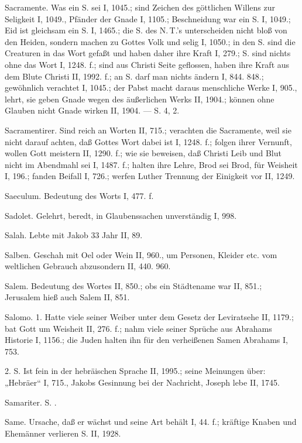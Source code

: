 Sacramente. Was ein S. sei I, 1045.; sind Zeichen des göttlichen Willens zur Seligkeit I, 1049., Pfänder der Gnade I, 1105.; Beschneidung war ein S. I, 1049.; Eid ist gleichsam ein S. I, 1465.; die S. des N.\,T.’s unterscheiden nicht bloß von den Heiden, sondern machen zu Gottes Volk und selig I, 1050.; in den S. sind die Creaturen in das Wort gefaßt und haben daher ihre Kraft I, 279.; S. sind nichts ohne das Wort I, 1248. f.; sind aus Christi Seite geflossen, haben ihre Kraft aus dem Blute Christi II, 1992. f.; an S. darf man nichts ändern I, 844. 848.; gewöhnlich verachtet I, 1045.; der Pabst macht daraus menschliche Werke I, 905., lehrt, sie geben Gnade wegen des äußerlichen Werks II, 1904.; können ohne Glauben nicht Gnade wirken II, 1904. — S.  4,  2.

Sacramentirer. Sind reich an Worten II, 715.; verachten die Sacramente, weil sie nicht darauf achten, daß Gottes Wort dabei ist I, 1248. f.; folgen ihrer Vernunft, wollen Gott meistern II, 1290. f.; wie sie beweisen, daß Christi Leib und Blut nicht im Abendmahl sei I, 1487. f.; halten ihre Lehre, Brod sei Brod, für Weisheit I, 196.; fanden Beifall I, 726.; werfen Luther Trennung der Einigkeit vor II, 1249.

Saeculum. Bedeutung des Worts I, 477. f.

Sadolet. Gelehrt, beredt, in Glaubenssachen unverständig I, 998.

Salah. Lebte mit Jakob 33 Jahr II, 89.

Salben. Geschah mit Oel oder Wein II, 960., um Personen, Kleider etc. vom weltlichen Gebrauch abzusondern II, 440. 960.

Salem. Bedeutung des Wortes II, 850.; obs ein Städtename war II, 851.; Jerusalem hieß auch Salem II, 851.

Salomo. 1.  Hatte viele seiner Weiber unter dem Gesetz der Leviratsehe II, 1179.; bat Gott um Weisheit II, 276. f.; nahm viele seiner Sprüche aus Abrahams Historie I, 1156.; die Juden halten ihn für den verheißenen Samen Abrahams I, 753.

2.  S. Ist fein in der hebräischen Sprache II, 1995.; seine Meinungen über: „Hebräer“ I, 715., Jakobs Gesinnung bei der Nachricht, Joseph lebe II, 1745.

Samariter. S. .

Same. Ursache, daß er wächst und seine Art behält I, 44. f.; kräftige Knaben und Ehemänner verlieren S. II, 1928.

